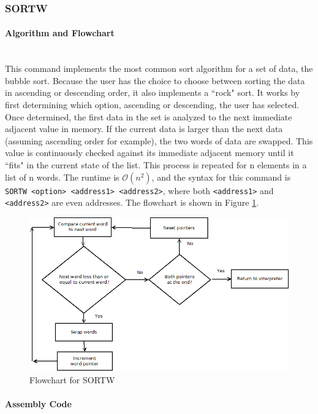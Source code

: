 \documentclass[12pt]{article}
\begin{document}
			\subsubsection{SORTW}
			
			\paragraph{Algorithm and Flowchart}~\\
			This command implements the most common sort algorithm for a set of data, the bubble sort. Because the user has the choice to choose between sorting the data in ascending or descending order, it also implements a ``rock" sort. It works by first determining which option, ascending or descending, the user has selected. Once determined, the first data in the set is analyzed to the next immediate adjacent value in memory. If the current data is larger than the next data (assuming ascending order for example), the two words of data are swapped. This value is continuously checked against its immediate adjacent memory until it ``fits" in the current state of the list. This process is repeated for n elements in a list of n words. The runtime is $\mathcal{O}(n^2)$, and the syntax for this command is \texttt{SORTW <option> <address1> <address2>}, where both \texttt{<address1>} and \texttt{<address2>} are even addresses. The flowchart is shown in Figure \ref{fig:SORTW}.
			
			
\begin{figure}
\centering
\includegraphics[width=0.7\linewidth]{SORTW}
\caption{Flowchart for SORTW}
\label{fig:SORTW}
\end{figure}
			\paragraph{Assembly Code}~\\
			
\end{document}
